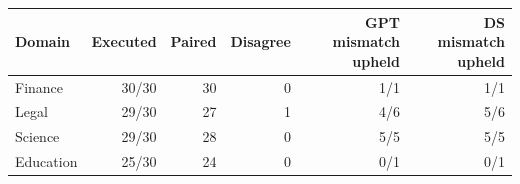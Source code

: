 \begin{tabular}{lrrrrr}
\toprule
Domain & Executed & Paired & Disagree & GPT mismatch upheld & DS mismatch upheld \\
\midrule
Finance & 30/30 & 30 & 0 & 1/1 & 1/1 \\
Legal & 29/30 & 27 & 1 & 4/6 & 5/6 \\
Science & 29/30 & 28 & 0 & 5/5 & 5/5 \\
Education & 25/30 & 24 & 0 & 0/1 & 0/1 \\
\bottomrule
\end{tabular}
